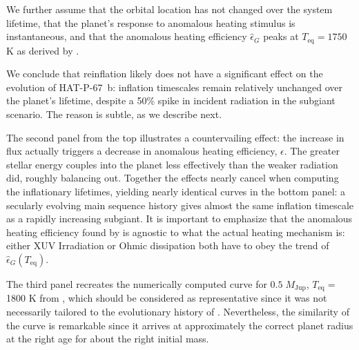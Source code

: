 \documentclass[linenumbers, twocolumn, trackchanges]{aastex631}
\newcommand{\hatpb}{\object{HAT-P-67 b}}
\begin{document}
We further assume that the orbital location has not changed over the system lifetime, that the planet's response to anomalous heating stimulus is instantaneous, and that the anomalous heating efficiency $\hat{\epsilon}_G$ peaks at $T_\mathrm{eq}=1750$ K as derived by \citet{2018AJ....155..214T}.

We conclude that reinflation likely does not have a significant effect on the evolution of HAT-P-67~b: inflation timescales remain relatively unchanged over the planet's lifetime, despite a 50\% spike in incident radiation in the subgiant scenario.  The reason is subtle, as we describe next.

The second panel from the top illustrates a countervailing effect: the increase in flux actually triggers a decrease in anomalous heating efficiency, $\epsilon$. The greater stellar energy couples into the planet less effectively than the weaker radiation did, roughly balancing out. Together the effects nearly cancel when computing the inflationary lifetimes, yielding nearly identical curves in the bottom panel: a secularly evolving main sequence history gives almost the same inflation timescale as a rapidly increasing subgiant.  It is important to emphasize that the anomalous heating efficiency found by \citet{2018AJ....155..214T} is agnostic to what the actual heating mechanism is: either XUV Irradiation or Ohmic dissipation both have to obey the trend of $\hat{\epsilon}_G(T_\mathrm{eq})$.

The third panel recreates the numerically computed curve for $0.5\;M_\mathrm{Jup}$, $T_\mathrm{eq}=$1800 K from \citep{2011ApJ...738....1B}, which should be considered as representative since it was not necessarily tailored to the evolutionary history of \hatpb.  Nevertheless, the similarity of the curve is remarkable since it arrives at approximately the correct planet radius at the right age for about the right initial mass.
\end{document}
